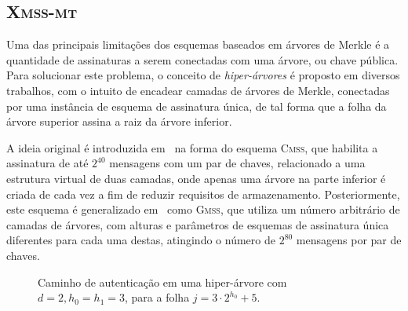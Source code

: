 \documentclass[12pt,notitlepage]{report}
\newcommand{\pk}{\mathcal{P}_k}
\newcommand{\cmss}{\textsc{Cmss}}
\newcommand{\gmss}{\textsc{Gmss}}
\newcommand{\xmssmt}{\textsc{Xmss-mt}}
\begin{document}
\subsection{\xmssmt{}}
\label{subsection:xmssmt}

Uma das principais limitações dos esquemas baseados em árvores de Merkle é a quantidade de assinaturas a serem conectadas com uma árvore, ou chave pública. Para solucionar este problema, o conceito de \emph{hiper-árvores} é proposto em diversos trabalhos, com o intuito de encadear camadas de árvores de Merkle, conectadas por uma instância de esquema de assinatura única, de tal forma que a folha da árvore superior assina a raiz da árvore inferior.

A ideia original é introduzida em~\cite{Buchmann:2006:CIM:2087445.2087479} na forma do esquema \cmss{}, que habilita a assinatura de até $2^{40}$ mensagens com um par de chaves, relacionado a uma estrutura virtual de duas camadas, onde apenas uma árvore na parte inferior é criada de cada vez a fim de reduzir requisitos de armazenamento. Posteriormente, este esquema é generalizado em~\cite{Buchmann:2007:MSV:1419765.1419769} como \gmss{}, que utiliza um número arbitrário de camadas de árvores, com alturas e parâmetros de esquemas de assinatura única diferentes para cada uma destas, atingindo o número de $2^{80}$ mensagens por par de chaves.

\begin{figure}
    \centering
    \caption{Caminho de autenticação em uma hiper-árvore com $d = 2, h_0 = h_1 = 3$, para a folha $j = 3 \cdot 2^{h_0} + 5$.}
    \label{fig:8}
\end{figure}
\end{document}
